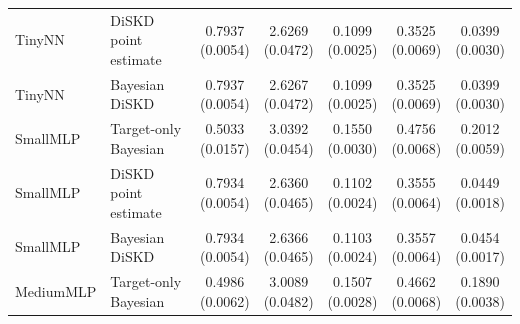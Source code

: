 \documentclass{article} %
\begin{document}
\begin{table}[!htbp]
\begin{tabular}{llccccc}
TinyNN & DiSKD point estimate & \shortstack{0.7937\\(0.0054)} & \shortstack{2.6269\\(0.0472)} & \shortstack{0.1099\\(0.0025)} & \shortstack{0.3525\\(0.0069)} & \shortstack{0.0399\\(0.0030)} \\
TinyNN & Bayesian DiSKD & \shortstack{0.7937\\(0.0054)} & \shortstack{2.6267\\(0.0472)} & \shortstack{0.1099\\(0.0025)} & \shortstack{0.3525\\(0.0069)} & \shortstack{0.0399\\(0.0030)} \\
\addlinespace
SmallMLP & Target-only Bayesian & \shortstack{0.5033\\(0.0157)} & \shortstack{3.0392\\(0.0454)} & \shortstack{0.1550\\(0.0030)} & \shortstack{0.4756\\(0.0068)} & \shortstack{0.2012\\(0.0059)} \\
SmallMLP & DiSKD point estimate & \shortstack{0.7934\\(0.0054)} & \shortstack{2.6360\\(0.0465)} & \shortstack{0.1102\\(0.0024)} & \shortstack{0.3555\\(0.0064)} & \shortstack{0.0449\\(0.0018)} \\
SmallMLP & Bayesian DiSKD & \shortstack{0.7934\\(0.0054)} & \shortstack{2.6366\\(0.0465)} & \shortstack{0.1103\\(0.0024)} & \shortstack{0.3557\\(0.0064)} & \shortstack{0.0454\\(0.0017)} \\
\addlinespace
MediumMLP & Target-only Bayesian & \shortstack{0.4986\\(0.0062)} & \shortstack{3.0089\\(0.0482)} & \shortstack{0.1507\\(0.0028)} & \shortstack{0.4662\\(0.0068)} & \shortstack{0.1890\\(0.0038)} \\

\end{tabular}
\end{table}
\end{document}
